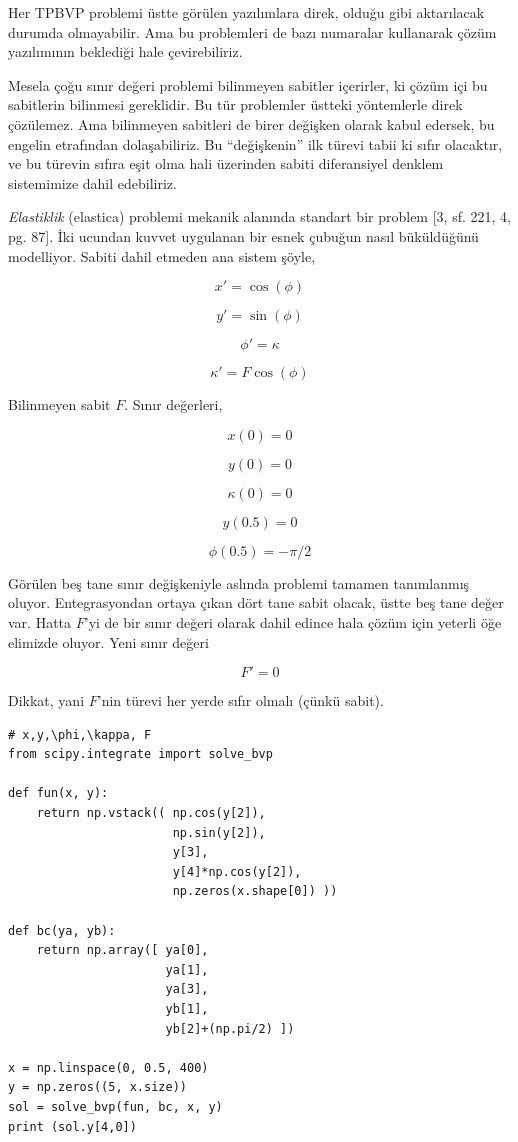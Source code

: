 \documentclass[12pt,fleqn]{article}\usepackage{../../common}
\begin{document}
Her TPBVP problemi üstte görülen yazılımlara direk, olduğu gibi aktarılacak
durumda olmayabilir. Ama bu problemleri de bazı numaralar kullanarak
çözüm yazılımının beklediği hale çevirebiliriz. 

Mesela çoğu sınır değeri problemi bilinmeyen sabitler içerirler, ki çözüm
içi bu sabitlerin bilinmesi gereklidir. Bu tür problemler üstteki
yöntemlerle direk çözülemez. Ama bilinmeyen sabitleri de birer değişken
olarak kabul edersek, bu engelin etrafından dolaşabiliriz. Bu
``değişkenin'' ilk türevi tabii ki sıfır olacaktır, ve bu türevin sıfıra
eşit olma hali üzerinden sabiti diferansiyel denklem sistemimize dahil
edebiliriz. 

{\em Elastiklik} (elastica) problemi mekanik alanında standart bir problem
[3, sf. 221, 4, pg. 87]. İki ucundan kuvvet uygulanan bir esnek çubuğun
nasıl büküldüğünü modelliyor. Sabiti dahil etmeden ana sistem şöyle,

$$
x' = \cos (\phi) 
$$

$$
y' = \sin (\phi) 
$$

$$
\phi' = \kappa
$$

$$
\kappa' = F \cos (\phi)
$$

Bilinmeyen sabit $F$. Sınır değerleri,

$$
x(0) = 0
$$

$$
y(0) = 0
$$

$$
\kappa(0) = 0
$$

$$
y(0.5) = 0
$$

$$
\phi(0.5) = -\pi/2
$$

Görülen beş tane sınır değişkeniyle aslında problemi tamamen tanımlanmış
oluyor. Entegrasyondan ortaya çıkan dört tane sabit olacak, üstte beş tane
değer var. Hatta $F$'yi de bir sınır değeri olarak dahil edince hala çözüm
için yeterli öğe elimizde oluyor. Yeni sınır değeri

$$
F' = 0
$$

Dikkat, yani $F$'nin türevi her yerde sıfır olmalı (çünkü sabit).

\begin{verbatim}
# x,y,\phi,\kappa, F
from scipy.integrate import solve_bvp

def fun(x, y):
    return np.vstack(( np.cos(y[2]),
                       np.sin(y[2]),
                       y[3],
                       y[4]*np.cos(y[2]),
                       np.zeros(x.shape[0]) ))

def bc(ya, yb):
    return np.array([ ya[0],
                      ya[1],
                      ya[3],
                      yb[1],
                      yb[2]+(np.pi/2) ])

x = np.linspace(0, 0.5, 400)
y = np.zeros((5, x.size))
sol = solve_bvp(fun, bc, x, y)
print (sol.y[4,0])
\end{verbatim}
\end{document}
